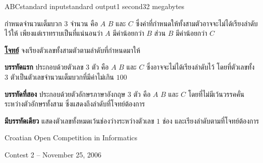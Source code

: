 \documentclass[11pt,a4paper]{article}
\begin{document}
\begin{problem}{ABC}{standard input}{standard output}{1 second}{32 megabytes}

กำหนดจำนวนเต็มบวก $3$ จำนวน คือ $A$ $B$ และ $C$ ซึ่งค่าที่กำหนดให้ทั้งสามตัวอาจจะไม่ได้เรียงลำดับไว้ให้ เพียงแต่เราทราบเป็นที่แน่นอนว่า $A$ มีค่าน้อยกว่า $B$ ส่วน $B$ มีค่าน้อยกว่า $C$

\underline{\textbf{โจทย์}} จงเรียงตัวเลขทั้งสามตัวตามลำดับที่กำหนดมาให้

\InputFile

\textbf{บรรทัดแรก} ประกอบด้วยตัวเลข $3$ ตัว คือ $A$ $B$ และ $C$ ซึ่งอาจจะไม่ได้เรียงลำดับไว้ โดยที่ตัวเลขทั้ง $3$ ตัวเป็นตัวเลขจำนวนเต็มบวกที่มีค่าไม่เกิน $100$ 

\textbf{บรรทัดที่สอง} ประกอบด้วยตัวอักษรภาษาอังกฤษ $3$ ตัว คือ $A$ $B$ และ $C$ โดยที่ไม่มีเว้นวรรคคั่นระหว่างตัวอักษรทั้งสาม ซึ่งแสดงถึงลำดับที่โจทย์ต้องการ


\OutputFile

\textbf{มีบรรทัดเดียว} แสดงตัวเลขทั้งหมดเว้นช่องว่างระหว่างตัวเลข $1$ ช่อง และเรียงลำดับตามที่โจทย์ต้องการ

\Examples

\begin{example}
%
%
\end{example}

\Source

Croatian Open Competition in Informatics 

Contest 2 – November 25, 2006

\end{problem}
\end{document}
